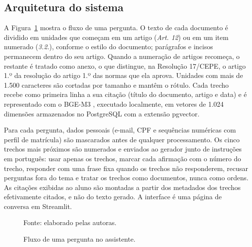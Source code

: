 \documentclass{sbc-template}
\begin{document}
\subsection{Arquitetura do sistema}
\label{sec:arquitetura}

A Figura~\ref{fig:arquitetura} mostra o fluxo de uma pergunta. O texto de cada
documento é dividido em unidades que começam em um artigo (\textit{Art. 12}) ou em um
item numerado (\textit{3.2.}), conforme o estilo do documento; parágrafos e incisos
permanecem dentro do seu artigo. Quando a numeração de artigos recomeça, o restante é
tratado como anexo, o que distingue, na Resolução 17/CEPE, o artigo 1.º da resolução
do artigo 1.º das normas que ela aprova. Unidades com mais de 1.500 caracteres são
cortadas por tamanho e mantêm o rótulo. Cada trecho recebe como primeira linha a sua
citação (título do documento, artigo e data) e é representado com o BGE-M3
\cite{Chen2024}, executado localmente, em vetores de 1.024 dimensões armazenados no
PostgreSQL com a extensão pgvector.

Para cada pergunta, dados pessoais (e-mail, CPF e sequências numéricas com perfil de
matrícula) são mascarados antes de qualquer processamento. Os cinco trechos mais
próximos são numerados e enviados ao gerador junto de instruções em português: usar
apenas os trechos, marcar cada afirmação com o número do trecho, responder com uma
frase fixa quando os trechos não responderem, recusar perguntas fora do tema e tratar
os trechos como documentos, nunca como ordens. As citações exibidas ao aluno são
montadas a partir dos metadados dos trechos efetivamente citados, e não do texto
gerado. A interface é uma página de conversa em Streamlit.

\begin{figure}[ht]
\centering
{}
\caption{Fluxo de uma pergunta no assistente.}
\label{fig:arquitetura}

\vspace{2pt}
{\footnotesize Fonte: elaborado pelas autoras.}
\end{figure}
\end{document}

